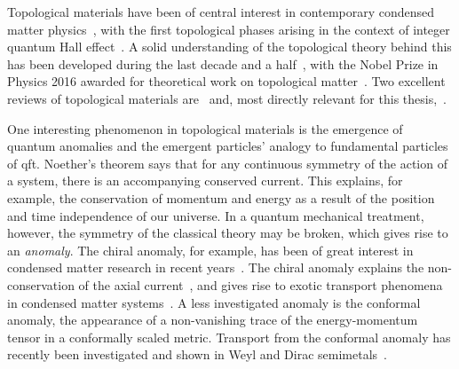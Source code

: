 %
Topological materials have been of central interest in contemporary condensed matter physics~\cite{fruchartIntroductionTopologicalInsulators2013}, with the first topological phases arising in the context of integer quantum Hall effect~\cites{klitzingNewMethodHighAccuracy1980}[as cited in][]{fruchartIntroductionTopologicalInsulators2013}.
A solid understanding of the topological theory behind this has been developed during the last decade and a half~\cite{fruchartIntroductionTopologicalInsulators2013, bernevigTopologicalInsulatorsTopological2013}, with the Nobel Prize in Physics 2016 awarded for theoretical work on topological matter~\cite{royalswedishacademyofsciencesNobelPrizePhysics2016}.
Two excellent reviews of topological materials are~\cite{fruchartIntroductionTopologicalInsulators2013} and, most directly relevant for this thesis,~\cite{armitageWeylDiracSemimetals2018}.

One interesting phenomenon in topological materials is the emergence of quantum anomalies and the emergent particles' analogy to fundamental particles of \gls{qft}.
Noether's theorem says that for any continuous symmetry of the action of a system, there is an accompanying conserved current.
This explains, for example, the conservation of momentum and energy as a result of the position and time independence of our universe.
In a quantum mechanical treatment, however, the symmetry of the classical theory may be broken, which gives rise to an \emph{anomaly}.
The chiral anomaly, for example, has been of great interest in condensed matter research in recent years~\cite{arjonaFingerprintsConformalAnomaly2019}.
The chiral anomaly explains the non-conservation of the axial current~\cite{zeeQuantumFieldTheory2010}, and gives rise to exotic transport phenomena in condensed matter systems~\cite{burkovChiralAnomalyTransport2015, wehlingDiracMaterials2014, burkovTopologicalSemimetals2016}.
A less investigated anomaly is the conformal anomaly, the appearance of a non-vanishing trace of the energy-momentum tensor in a conformally scaled metric.
Transport from the conformal anomaly has recently been investigated and shown in Weyl and Dirac semimetals~\cite{chernodubAnomalousTransportDue2016, chernodubGenerationNernstCurrent2018, arjonaFingerprintsConformalAnomaly2019,arjonaromanoNovelThermoelectricElastic2019}.

